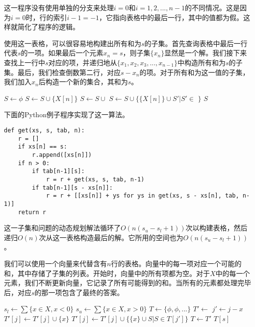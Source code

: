 \documentclass[UTF8]{article}
\begin{document}
这一程序没有使用单独的分支来处理$i = 0$和$i = 1, 2, ..., n-1$的不同情况。这是因为$i = 0$时，行的索引$i - 1 = -1$，它指向表格中的最后一行，其中的值都为假。这样就简化了程序的逻辑。

使用这一表格，可以很容易地构建出所有和为$s$的子集。首先查询表格中最后一行代表$s$的一项。如果最后一个元素$x_n = s$，则子集$\{x_n\}$显然是一个解。我们接下来查找上一行中$s$对应的项，并递归地从$\{x_1, x_2, x_3, ..., x_{n-1}\}$中构造所有和为$s$的子集。最后，我们检查倒数第二行，对应$s - x_n$的项。对于所有和为这一值的子集，我们加入$x_n$后构造一个新的集合，其和为$s$。

\begin{algorithmic}[1]
  \State $S \gets \phi$
    \State $S \gets S \cup \{X[n]\}$
  \EndIf
      \State $S \gets S \cup $ 
    \EndIf
      \State $S \gets S \cup \{\{X[n]\} \cup S' | S' \in $  $\}$
    \EndIf
  \EndIf
  \State \Return $S$
\EndFunction
\end{algorithmic}

下面的Python例子程序实现了这一算法。

\lstset{language=Python}
\begin{lstlisting}
def get(xs, s, tab, n):
    r = []
    if xs[n] == s:
        r.append([xs[n]])
    if n > 0:
        if tab[n-1][s]:
            r = r + get(xs, s, tab, n-1)
        if tab[n-1][s - xs[n]]:
            r = r + [[xs[n]] + ys for ys in get(xs, s - xs[n], tab, n-1)]
    return r
\end{lstlisting}

这一子集和问题的动态规划解法循环了$O(n(s_u - s_l + 1))$次以构建表格，然后递归$O(n)$次从这一表格构造最后的解。它所用的空间也为$O(n(s_u - s_l + 1))$。

我们可以使用一个向量来代替含有$n$行的表格。向量中的每一项对应一个可能的和，其中存储了子集的列表。开始时，向量中的所有项都为空。对于$X$中的每一个元素，我们不断更新向量，它记录了所有可能得到的和。当所有的元素都处理完毕后，对应$s$的那一项包含了最终的答案。

\begin{algorithmic}[1]
  \State $s_l \gets \sum \{x \in X, x < 0\}$
  \State $s_u \gets \sum \{x \in X, x > 0\}$
  \State $T \gets \{\phi, \phi, ...\}$ 
    \State $T' \gets$ 
      \State $j' \gets j - x$
        \State $T'[j] \gets T'[j] \cup \{x\}$
      \EndIf
        \State $T'[j] \gets T'[j] \cup \{\{x\} \cup S | S \in T[j']\}$
      \EndIf
    \EndFor
    \State $T \gets T'$
  \EndFor
  \State \Return $T[s]$
\EndFunction
\end{algorithmic}
\end{document}
